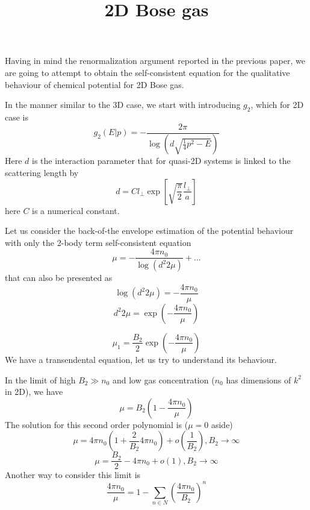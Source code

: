 \documentclass[8pt,letterpaper,notitlepage]{article}
\begin{document}
\title{2D Bose gas}
\maketitle
Having in mind the renormalization argument reported in the previous paper, we are going to attempt to obtain the self-consistent equation for the qualitative behaviour of chemical potential for 2D Bose gas.

In the manner similar to the 3D case, we start with introducing  $g_2$, which for 2D case is 
\begin{equation}
g_2(E| p) = - \frac{2 \pi}{\log \left( d \sqrt{ \frac{1}{4} p^2 - E} \right) } 
\end{equation}
Here $d$ is the interaction parameter that for quasi-2D systems is linked to the scattering length by
\[
d = C l_{\perp} \exp \left[ \sqrt{\frac{\pi}{2}} \frac{l_{\perp}}{a} \right]
\]
here $C$ is a numerical constant.


Let us consider the back-of-the envelope estimation of the potential behaviour with only the 2-body term self-consistent equation
\begin{equation}
\mu = -\frac{4 \pi n_0}{\log (d^2 2 \mu)} + ...
\end{equation}
that can also be presented as
\begin{equation}
\log (d^2 2 \mu) = - \frac{4 \pi n_0}{\mu}
\end{equation}
\begin{equation}
d^2 2 \mu = \exp \left( - \frac{4 \pi n_0}{\mu} \right)
\end{equation}

\begin{equation}
\mu_1 = \frac{B_2}{2} \exp \left( - \frac{4 \pi n_0}{\mu} \right)
\end{equation}
We have a transendental equation, let us try to understand its behaviour.

In the limit of high $B_2 \gg n_0$ and low gas concentration ($n_0$ has dimensions of $k^2$ in 2D), we have
\[
\mu = B_2 \left( 1 - \frac{4 \pi n_0}{\mu} \right)
\]
The solution for this second order polynomial  is ($\mu=0$ aside) 
\[
\mu = 4 \pi n_0 \left(1 + \frac{2}{B_2} 4 \pi n_0 \right)  + o\left( \frac{1}{B_2} \right), B_2 \rightarrow \infty
\]
\[
\mu = \frac{B_2}{2} - 4 \pi n_0   + o\left( 1 \right), B_2 \rightarrow \infty
\]
Another way to consider this limit is
\begin{equation}
\frac{4 \pi n_0}{\mu} = 1 - \sum_{n \in N} \left( \frac{4 \pi n_0}{B_2} \right)^n
\end{equation}
\end{document}
